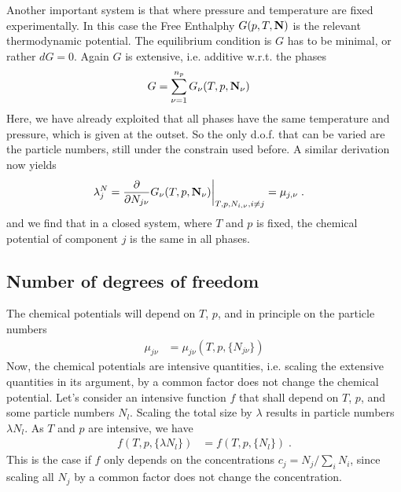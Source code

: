 Another important system is that where pressure and temperature are fixed experimentally.
In this case the  Free Enthalphy $G(p,T,\mathbf N)$ is the relevant thermodynamic potential.
The equilibrium condition is $G$ has to be minimal, or rather $dG=0$. Again $G$ is extensive, i.e.
additive w.r.t. the phases
%
\begin{align}\label{eq:}
G &= \sum_{\nu=1}^{n_{p} } G_{\nu}(T,p,\mathbf N_{\nu})
\end{align}
%
Here, we have already exploited that all phases have the same temperature and pressure, which is given at the outset. So the only d.o.f. that can be varied are the particle numbers, still under the constrain used before. A similar derivation now yields
%
\begin{align}\label{eq:mu:condition}
\lambda^{N}_{j}&=\frac{\partial }{\partial N_{j\nu}} G_{\nu}(T,p,\mathbf N_{\nu})\bigg|_{T,p,N_{i,\nu},i\ne j} = \mu_{j,\nu}\;.
\end{align}
%
and we find that in a closed system, where $T$ and $p$ is fixed, the chemical potential of component
$j$ is the same in all phases.
\subsection{Number of degrees of freedom}
The chemical potentials will depend on $T$, $p$, and in principle on the particle numbers
%
\begin{align}\label{eq:}
\mu_{j\nu} &=\mu_{j\nu}(T,p,\{N_{j\nu}\})
\end{align}
%
Now, the chemical potentials are intensive quantities, i.e. scaling the extensive quantities in its argument, by a common factor does not change the chemical potential. Let's consider an intensive function
$f$ that shall depend on $T$, $p$, and some particle numbers $N_{l}$. Scaling the total size
by $\lambda$ results in particle numbers $\lambda N_{l}$. As $T$ and $p$ are intensive,
we have 
%
\begin{align*}
f(T,p,\{\lambda N_{l}\}) &= f(T,p,\{N_{l}\})\;.
\end{align*}
%
This is the case if $f$ only depends on the concentrations $c_{j}=N_{j}/\sum_{i} N_{i}$, since
scaling all $N_{j}$ by a common factor does not change the concentration.



